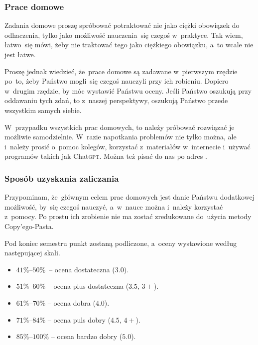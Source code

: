 \documentclass[10pt,t]{beamer}
\begin{document}
\begin{frame}
  \frametitle{Prace domowe}


  Zadania domowe proszę \alert{spróbować} potraktować nie jako ciężki
  obowiązek do odhaczenia, tylko jako możliwość nauczenia~się czegoś
  w~praktyce. Tak wiem, łatwo~się mówi, żeby nie traktować tego jako
  ciężkiego obowiązku, a~to wcale nie jest łatwe.

  Proszę jednak wiedzieć, że~prace domowe są zadawane w~pierwszym rzędzie
  po~to, żeby Państwo mogli~się czegoś nauczyli przy ich robieniu. Dopiero
  w~drugim rzędzie, by móc wystawić Państwu oceny. Jeśli Państwo oszukują
  przy oddawaniu tych zdań, to z~naszej perspektywy, oszukują Państwo przede
  wszystkim samych siebie.

  W~przypadku wszystkich prac domowych, to należy próbować rozwiązać je
  możliwie samodzielnie. W~razie napotkania problemów nie tylko można,
  ale i~\alert{należy} prosić o~pomoc kolegów, korzystać z~materiałów
  w~internecie i~używać programów takich jak Chat\textsc{gpt}. Można też
  pisać do nas po adres \email.

\end{frame}





\begin{frame}
  \frametitle{Sposób uzyskania zaliczania}


  Przypominam, że~głównym celem prac domowych jest danie Państwu dodatkowej
  możliwość, by~się czegoś nauczyć, a~w~nauce można i~\alert{należy}
  korzystać z~pomocy. Po prostu ich zrobienie nie ma zostać zredukowane
  do~użycia metody Copy’ego-Pasta.

  Pod koniec semestru punkt zostaną podliczone, a~oceny wystawione według
  następującej skali.

  \begin{itemize}

  \item $41\%\text{--}50\%$~-- ocena dostateczna ($3.0$).

  \item $51\%\text{--}60\%$ -- ocena plus dostateczna ($3.5$, $3+$).

  \item $61\%\text{--}70\%$ -- ocena dobra ($4.0$).

  \item $71\%\text{--}84\%$ -- ocena puls dobry ($4.5$, $4+$).

  \item $85\%\text{--}100\%$ -- ocena bardzo dobry ($5.0$).

  \end{itemize}

\end{frame}
\end{document}
